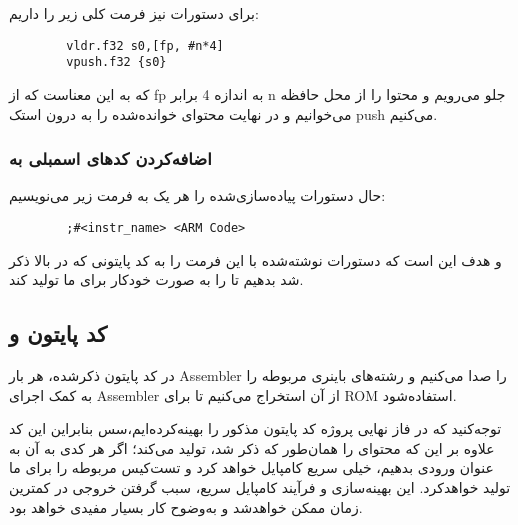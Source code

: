 \begin{itemize}
	برای دستورات
	نیز فرمت کلی زیر را داریم:
	
	\begin{latin}
		\begin{verbatim}
		vldr.f32 s0,[fp, #n*4] 
		vpush.f32 {s0}
		\end{verbatim}
	\end{latin}
	
	که به این معناست که از fp به اندازه 4 برابر n جلو می‌رویم و محتوا را از محل حافظه می‌خوانیم و در نهایت محتوای خوانده‌شده را به درون استک push می‌کنیم.
	
	\subsubsection*{اضافه‌کردن کدهای اسمبلی به 
		}
	
	حال دستورات پیاده‌سازی‌شده را هر یک به فرمت زیر می‌نویسیم:
	
	\begin{latin}
		\begin{verbatim}
		;#<instr_name> <ARM Code>
		\end{verbatim}
	\end{latin}
	
	و هدف این است که دستورات نوشته‌شده با این فرمت را به کد پایتونی که در بالا  ذکر شد بدهیم تا 
	را به صورت خودکار برای ما تولید کند.
\end{itemize}

\subsection*{کد پایتون و 
}
در کد پایتون ذکرشده،
 هر بار Assembler را صدا می‌کنیم و رشته‌های باینری مربوطه را به کمک اجرای Assembler از آن استخراج می‌کنیم تا برای ROM استفاده‌شود.

توجه‌کنید که در فاز نهایی پروژه کد پایتون مذکور را بهینه‌کرده‌ایم،سس بنابراین این کد علاوه بر این که محتوای
 را همان‌طور که ذکر شد، تولید می‌کند؛ اگر هر کدی به آن به عنوان ورودی بدهیم، خیلی سریع کامپایل خواهد کرد و تست‌کیس مربوطه را برای ما تولید خواهدکرد. این بهینه‌سازی و فرآیند کامپایل سریع، سبب گرفتن خروجی در کمترین زمان ممکن خواهدشد و به‌وضوح کار بسیار مفیدی خواهد بود.